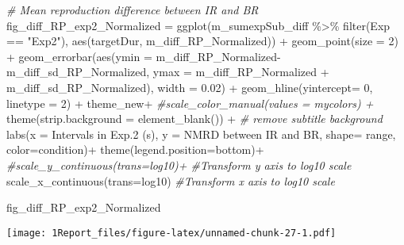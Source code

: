 \documentclass[
]{article}
\newenvironment{Shaded}{\begin{snugshade}}{\end{snugshade}}
\newcommand{\AttributeTok}[1]{\textcolor[rgb]{0.77,0.63,0.00}{#1}}
\newcommand{\CommentTok}[1]{\textcolor[rgb]{0.56,0.35,0.01}{\textit{#1}}}
\newcommand{\DecValTok}[1]{\textcolor[rgb]{0.00,0.00,0.81}{#1}}
\newcommand{\FloatTok}[1]{\textcolor[rgb]{0.00,0.00,0.81}{#1}}
\newcommand{\FunctionTok}[1]{\textcolor[rgb]{0.00,0.00,0.00}{#1}}
\newcommand{\NormalTok}[1]{#1}
\newcommand{\OtherTok}[1]{\textcolor[rgb]{0.56,0.35,0.01}{#1}}
\newcommand{\SpecialCharTok}[1]{\textcolor[rgb]{0.00,0.00,0.00}{#1}}
\newcommand{\StringTok}[1]{\textcolor[rgb]{0.31,0.60,0.02}{#1}}
\begin{document}
\begin{Shaded}
\begin{Highlighting}[]
\CommentTok{\# Mean reproduction difference between IR and BR}
\NormalTok{fig\_diff\_RP\_exp2\_Normalized }\OtherTok{=} \FunctionTok{ggplot}\NormalTok{(m\_sumexpSub\_diff }\SpecialCharTok{\%\textgreater{}\%} \FunctionTok{filter}\NormalTok{(Exp }\SpecialCharTok{==} \StringTok{"Exp2"}\NormalTok{), }\FunctionTok{aes}\NormalTok{(targetDur, m\_diff\_RP\_Normalized)) }\SpecialCharTok{+} 
  \FunctionTok{geom\_point}\NormalTok{(}\AttributeTok{size =} \DecValTok{2}\NormalTok{) }\SpecialCharTok{+}
  \FunctionTok{geom\_errorbar}\NormalTok{(}\FunctionTok{aes}\NormalTok{(}\AttributeTok{ymin =}\NormalTok{ m\_diff\_RP\_Normalized}\SpecialCharTok{{-}}\NormalTok{m\_diff\_sd\_RP\_Normalized, }\AttributeTok{ymax =}\NormalTok{ m\_diff\_RP\_Normalized }\SpecialCharTok{+}\NormalTok{ m\_diff\_sd\_RP\_Normalized), }\AttributeTok{width =} \FloatTok{0.02}\NormalTok{) }\SpecialCharTok{+}
  \FunctionTok{geom\_hline}\NormalTok{(}\AttributeTok{yintercept=} \DecValTok{0}\NormalTok{, }\AttributeTok{linetype =} \DecValTok{2}\NormalTok{) }\SpecialCharTok{+}
\NormalTok{  theme\_new}\SpecialCharTok{+} \CommentTok{\#scale\_color\_manual(values = mycolors) +}
  \FunctionTok{theme}\NormalTok{(}\AttributeTok{strip.background =} \FunctionTok{element\_blank}\NormalTok{()) }\SpecialCharTok{+} \CommentTok{\# remove subtitle background}
  \FunctionTok{labs}\NormalTok{(}\AttributeTok{x =} \StringTok{\textquotesingle{}Intervals in Exp.2 (s)\textquotesingle{}}\NormalTok{, }\AttributeTok{y =} \StringTok{\textquotesingle{}NMRD between IR and BR\textquotesingle{}}\NormalTok{, }\AttributeTok{shape=} \StringTok{\textquotesingle{}range\textquotesingle{}}\NormalTok{, }\AttributeTok{color=}\StringTok{\textquotesingle{}condition\textquotesingle{}}\NormalTok{)}\SpecialCharTok{+} 
  \FunctionTok{theme}\NormalTok{(}\AttributeTok{legend.position=}\StringTok{\textquotesingle{}bottom\textquotesingle{}}\NormalTok{)}\SpecialCharTok{+}
  \CommentTok{\#scale\_y\_continuous(trans=\textquotesingle{}log10\textquotesingle{})+ \#Transform y axis to log10 scale}
  \FunctionTok{scale\_x\_continuous}\NormalTok{(}\AttributeTok{trans=}\StringTok{\textquotesingle{}log10\textquotesingle{}}\NormalTok{) }\CommentTok{\#Transform x axis to log10 scale}

\NormalTok{fig\_diff\_RP\_exp2\_Normalized}
\end{Highlighting}
\end{Shaded}

\texttt{[image: 1Report\_files/figure-latex/unnamed-chunk-27-1.pdf]}
\end{document}

